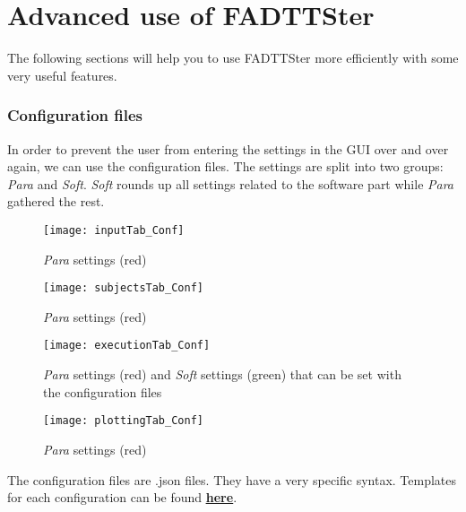 \documentclass[fadttsterUserGuide_master]{subfiles}
\begin{document}
	\part{Advanced use of FADTTSter}
	The following sections will help you to use FADTTSter more efficiently with some very useful features.
	
	\section{Configuration files}
	In order to prevent the user from entering the settings in the GUI over and over again, we can use the configuration files. The settings are split into two groups: \textit{Para} and \textit{Soft}. \textit{Soft} rounds up all settings related to the software part while \textit{Para} gathered the rest.
	\vfill
	\begin{figure}[H]
  		\centering
    	\texttt{[image: inputTab\_Conf]}
    	\caption{\textit{Para} settings (red)}
    	\label{fig:inputTab_Conf}
    \end{figure}
    \vfill
    \newpage
    
    \begin{figure}[H]
  		\centering
    	\texttt{[image: subjectsTab\_Conf]}
    	\caption{\textit{Para} settings (red)}
    	\label{fig:subjectsTab_Conf}
    \end{figure}
    \vfill
    \begin{figure}[H]
  		\centering
    	\texttt{[image: executionTab\_Conf]}
    	\caption{\textit{Para} settings (red) and \textit{Soft} settings (green) that can be set with the configuration files}
    	\label{fig:executionTab_Conf}
    \end{figure}
    \vfill
    \newpage
    
    \begin{figure}[H]
  		\centering
    	\texttt{[image: plottingTab\_Conf]}
    	\caption{\textit{Para} settings (red)}
    	\label{fig:plottingTab_Conf}
    \end{figure}
	
	The configuration files are .json files. They have a very specific syntax. Templates for each configuration can be found \href{https://github.com/jeantm/FADTTSter/tree/master/doc/ConfigurationFiles_Example}{\underline{\textbf{here}}}.
	
\end{document}
